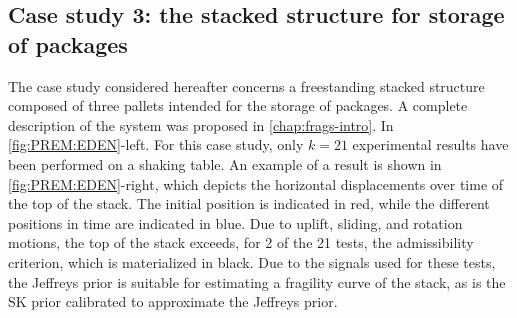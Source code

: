 





\subsection{Case study 3: the stacked structure for storage of packages}


The case study considered hereafter concerns a freestanding stacked structure composed of three pallets intended
for the storage of packages. A complete description of the system was proposed in   \cref{chap:frags-intro}. In \cref{fig:PREM:EDEN}-left. %
%
%
%
For this case study, only $k=21$
experimental results have been performed on a shaking table. %
An example of a result is
shown in \cref{fig:PREM:EDEN}-right, which depicts the horizontal displacements over time of the top of the stack. The initial position is
indicated in red, while the different positions in time are indicated in blue. Due to uplift, sliding, and rotation motions,
the top of the stack exceeds, for 2 of the 21 tests, the admissibility criterion, which is materialized in black. Due to
the signals used for these tests, the Jeffreys prior is suitable for estimating a fragility curve of the stack, as is the SK
prior calibrated to approximate the Jeffreys prior.


